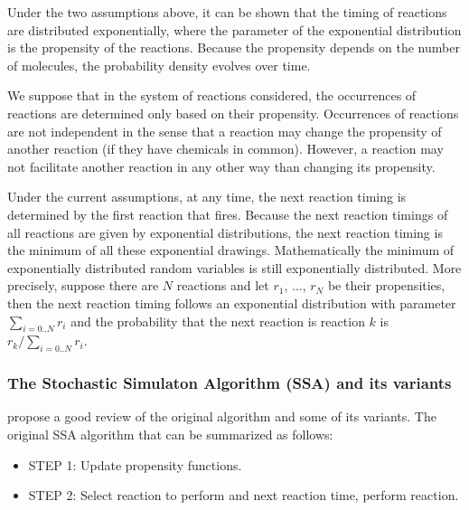 \begin {property}
  Under the two assumptions above, it can be shown that the timing of reactions are distributed exponentially, where the parameter of the exponential distribution is the propensity of the reactions. Because the propensity depends on the number of molecules, the probability density evolves over time.
\end {property}

\begin {assum}
  We suppose that in the system of reactions considered, the occurrences of reactions are determined only based on their propensity. Occurrences of reactions are not independent in the sense that a reaction may change the propensity of another reaction (if they have chemicals in common). However, a reaction may not facilitate another reaction in any other way than changing its propensity.
\end {assum}

\begin {property}
  Under the current assumptions, at any time, the next reaction timing is determined by the first reaction that fires. Because the next reaction timings of all reactions are given by exponential distributions, the next reaction timing is the minimum of all these exponential drawings. Mathematically the minimum of exponentially distributed random variables is still exponentially distributed. More precisely, suppose there are $N$ reactions and let $r_1$, ..., $r_N$ be their propensities, then the next reaction timing follows an exponential distribution with parameter $\sum_{i=0..N}r_i$ and the probability that the next reaction is reaction $k$ is $r_k/\sum_{i=0..N}r_i$.
\end {property}

\subsubsection{The Stochastic Simulaton Algorithm (SSA) and its variants}

\citet{gillespie_perspective:_2013} propose a good review of the original algorithm and some of its variants. The original SSA algorithm that can be summarized as follows:

\begin{itemize}
\item STEP 1: Update propensity functions.
\item STEP 2: Select reaction to perform and next reaction time, perform reaction.
\end{itemize}

